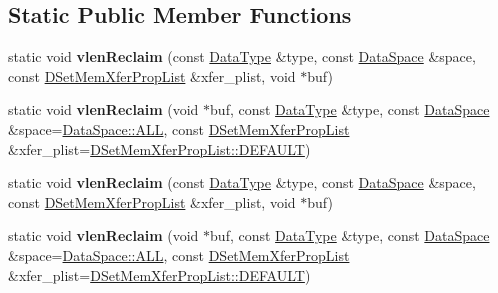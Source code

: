 \subsection*{Static Public Member Functions}
\begin{DoxyCompactItemize}
\item 
\mbox{\label{class_h5_1_1_data_set_a16606f3a7149c21e12499f1436a7398b}} 
static void {\bfseries vlen\+Reclaim} (const \hyperlink{class_h5_1_1_data_type}{Data\+Type} \&type, const \hyperlink{class_h5_1_1_data_space}{Data\+Space} \&space, const \hyperlink{class_h5_1_1_d_set_mem_xfer_prop_list}{D\+Set\+Mem\+Xfer\+Prop\+List} \&xfer\+\_\+plist, void $\ast$buf)
\item 
\mbox{\label{class_h5_1_1_data_set_ac911b7409dcfec0143ba3e688f701e0a}} 
static void {\bfseries vlen\+Reclaim} (void $\ast$buf, const \hyperlink{class_h5_1_1_data_type}{Data\+Type} \&type, const \hyperlink{class_h5_1_1_data_space}{Data\+Space} \&space=\hyperlink{class_h5_1_1_data_space_ae8a22405edd631eb923a327d39462ff2}{Data\+Space\+::\+A\+LL}, const \hyperlink{class_h5_1_1_d_set_mem_xfer_prop_list}{D\+Set\+Mem\+Xfer\+Prop\+List} \&xfer\+\_\+plist=\hyperlink{class_h5_1_1_d_set_mem_xfer_prop_list_ae69bf0ec7bccd4bb793ffe1ff770d8c4}{D\+Set\+Mem\+Xfer\+Prop\+List\+::\+D\+E\+F\+A\+U\+LT})
\item 
\mbox{\label{class_h5_1_1_data_set_a16606f3a7149c21e12499f1436a7398b}} 
static void {\bfseries vlen\+Reclaim} (const \hyperlink{class_h5_1_1_data_type}{Data\+Type} \&type, const \hyperlink{class_h5_1_1_data_space}{Data\+Space} \&space, const \hyperlink{class_h5_1_1_d_set_mem_xfer_prop_list}{D\+Set\+Mem\+Xfer\+Prop\+List} \&xfer\+\_\+plist, void $\ast$buf)
\item 
\mbox{\label{class_h5_1_1_data_set_ac911b7409dcfec0143ba3e688f701e0a}} 
static void {\bfseries vlen\+Reclaim} (void $\ast$buf, const \hyperlink{class_h5_1_1_data_type}{Data\+Type} \&type, const \hyperlink{class_h5_1_1_data_space}{Data\+Space} \&space=\hyperlink{class_h5_1_1_data_space_ae8a22405edd631eb923a327d39462ff2}{Data\+Space\+::\+A\+LL}, const \hyperlink{class_h5_1_1_d_set_mem_xfer_prop_list}{D\+Set\+Mem\+Xfer\+Prop\+List} \&xfer\+\_\+plist=\hyperlink{class_h5_1_1_d_set_mem_xfer_prop_list_ae69bf0ec7bccd4bb793ffe1ff770d8c4}{D\+Set\+Mem\+Xfer\+Prop\+List\+::\+D\+E\+F\+A\+U\+LT})
\end{DoxyCompactItemize}
